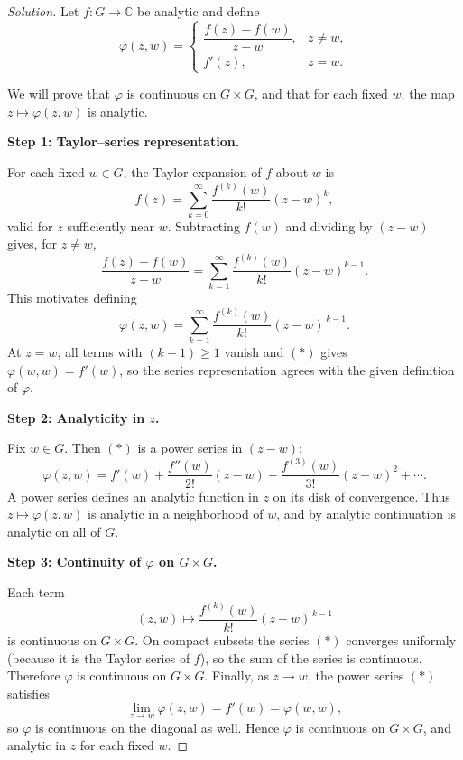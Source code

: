 \documentclass[12pt, a4paper]{report}
\theoremstyle{spaced}
\begin{document}
\begin{proof}[Solution]
	Let $f:G\to\mathbb{C}$ be analytic and define
	\[
		\varphi(z,w)=
		\begin{cases}
			\dfrac{f(z)-f(w)}{z-w}, & z\neq w, \\[6pt]
			f'(z),                  & z=w.
		\end{cases}
	\]

	We will prove that $\varphi$ is continuous on $G\times G$, and that for each fixed
	$w$, the map $z\mapsto \varphi(z,w)$ is analytic.

	\medskip
	\noindent\textbf{Step 1: Taylor–series representation.}

	For each fixed $w\in G$, the Taylor expansion of $f$ about $w$ is
	\[
		f(z)
		= \sum_{k=0}^{\infty} \frac{f^{(k)}(w)}{k!}(z-w)^k,
	\]
	valid for $z$ sufficiently near $w$.
	Subtracting $f(w)$ and dividing by $(z-w)$ gives, for $z\neq w$,
	\[
		\frac{f(z)-f(w)}{z-w}
		= \sum_{k=1}^{\infty} \frac{f^{(k)}(w)}{k!}(z-w)^{k-1}.
	\]
	This motivates defining
	\[
		\varphi(z,w)
		= \sum_{k=1}^{\infty} \frac{f^{(k)}(w)}{k!}(z-w)^{\,k-1}.
		\tag{*}
	\]
	At $z=w$, all terms with $(k-1)\ge1$ vanish and $(*)$ gives $\varphi(w,w)=f'(w)$,
	so the series representation agrees with the given definition of $\varphi$.

	\medskip
	\noindent\textbf{Step 2: Analyticity in $z$.}

	Fix $w\in G$.
	Then $(*)$ is a power series in $(z-w)$:
	\[
		\varphi(z,w)
		= f'(w) + \frac{f''(w)}{2!}(z-w)
		+ \frac{f^{(3)}(w)}{3!}(z-w)^2 + \cdots.
	\]
	A power series defines an analytic function in $z$ on its disk of convergence.
	Thus $z\mapsto \varphi(z,w)$ is analytic in a neighborhood of $w$, and by analytic
	continuation is analytic on all of $G$.

	\medskip
	\noindent\textbf{Step 3: Continuity of $\varphi$ on $G\times G$.}

	Each term
	\[
		(z,w)\mapsto \frac{f^{(k)}(w)}{k!}(z-w)^{\,k-1}
	\]
	is continuous on $G\times G$.
	On compact subsets the series $(*)$ converges uniformly (because it is the
	Taylor series of $f$), so the sum of the series is continuous.
	Therefore $\varphi$ is continuous on $G\times G$.
	Finally, as $z\to w$, the power series $(*)$ satisfies
	\[
		\lim_{z\to w} \varphi(z,w) = f'(w) = \varphi(w,w),
	\]
	so $\varphi$ is continuous on the diagonal as well.
	Hence $\varphi$ is continuous on $G\times G$, and analytic in $z$ for each fixed
	$w$.
\end{proof}
\end{document}
